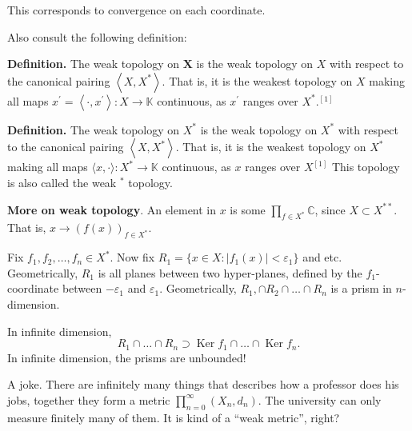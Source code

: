 \begin{remark}
	This corresponds to convergence on each coordinate.
\end{remark}

Also consult the following definition:

\textbf{Definition.} The weak topology on $\boldsymbol{X}$ is the weak topology on $X$ with respect to the canonical pairing $\left\langle X, X^*\right\rangle$. That is, it is the weakest topology on $X$ making all maps $x^{\prime}=\left\langle\cdot, x^{\prime}\right\rangle: X \rightarrow \mathbb{K}$ continuous, as $x^{\prime}$ ranges over $X^* .^{[1]}$

\textbf{Definition.} The weak topology on $X^*$ is the weak topology on $X^*$ with respect to the canonical pairing $\left\langle X, X^*\right\rangle$. That is, it is the weakest topology on $X^*$ making all maps $\langle x, \cdot\rangle: X^* \rightarrow \mathbb{K}$ continuous, as $x$ ranges over $X^{[1]}$ This topology is also called the weak $^*$ topology.

\textbf{More on weak topology}. An element in $x$ is some $\prod_{f \in X^*} \mathbb{C}$, since $X \subset X^{* *}$. That is, $x \to \left( f(x) \right) _{ f \in X^*}$.

Fix $f_1, f_2, \ldots, f_n \in X^*$. Now fix $R_1 = \{x \in X: |f_1(x)| < \varepsilon_1\} $ and etc. Geometrically, $R_1$ is all planes between two hyper-planes, defined by the $f_1$-coordinate between $- \varepsilon_1$ and $\varepsilon_1$. Geometrically, $R_1, \cap R_2 \cap \ldots \cap R_{n}$ is a prism in $n$-dimension.

In infinite dimension, 
\[
	R_1 \cap \ldots \cap R_n \supset \operatorname{Ker} f_1 \cap \ldots \cap \operatorname{Ker} f_n
.\] 
In infinite dimension, the prisms are unbounded!

\begin{remark}
	A joke. There are infinitely many things that describes how a professor does his jobs, together they form a metric $\prod_{n = 0}^\infty (X_n, d_n)$. The university can only measure finitely many of them. It is kind of a ``weak metric'', right?
\end{remark}


